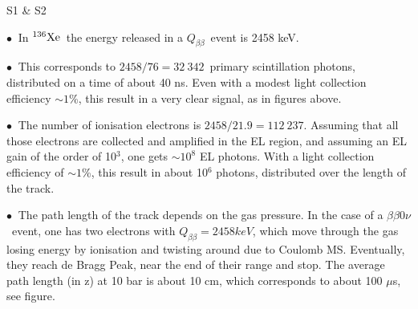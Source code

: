 \documentclass [aspectratio=169]{beamer}
\newcommand{\bbonu}{\ensuremath{\beta\beta0\nu}}
\newcommand{\qbb}{\ensuremath{Q_{\beta\beta}}}
\newcommand{\XE}{\ensuremath{{}^{136}{\rm Xe}}}
\begin{document}
\begin{frame}{S1 \& S2}

$\bullet~$ In \XE\, the energy released in a \qbb\ event is 2458 keV. 

$\bullet~$ This corresponds to $2458/76 = 32\ 342$~primary scintillation photons, distributed on a time of about 40 ns. Even with a modest light collection efficiency $\sim 1$\%, this result in a very clear signal, as in figures above.  

$\bullet~$ The number of ionisation electrons is $2458/21.9 = 112\ 237$. Assuming that all those electrons are collected and amplified in the EL region, and assuming an EL gain of the order of 10$^3$, one gets $\sim 10^8$ EL photons. With a light collection efficiency of $\sim 1$\%, this result in about 10$^6$ photons, distributed over the length of the track.  

 $\bullet~$  The path length of the track depends on the gas pressure. In the case of a \bbonu\ event, one has two electrons with $\qbb = 2458 keV$, which move through the gas losing energy by ionisation and twisting around due to Coulomb MS. Eventually, they reach de Bragg Peak, near the end of their range and stop. The average path length (in z) at 10 bar is about 10 cm, which corresponds to about 100 $\mu$s, see figure.  
 \end{frame}
 
\end{document}
